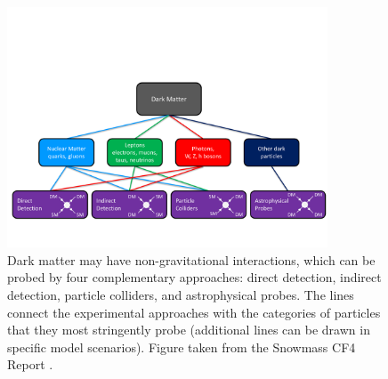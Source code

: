 \begin{figure}[t]
\centering
\includegraphics[width=0.85\textwidth]{figures/interactions.pdf}
\vspace{0.5em}
\caption{
\label{fig:interactions}
Dark matter may have non-gravitational interactions, which can be probed by four complementary approaches: 
direct detection, indirect detection, particle colliders, and astrophysical probes.
The lines connect the experimental approaches with the categories of particles that they most stringently probe (additional lines can be drawn in specific model scenarios). 
Figure taken from the Snowmass CF4 Report \citep{1305.1605}.
}
\end{figure}

